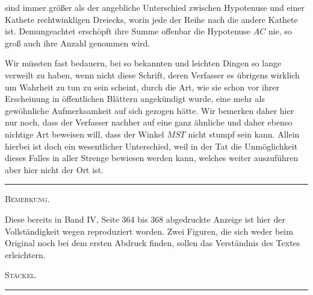 sind immer größer als der angebliche Unterschied zwischen Hypotenuse und einer
Kathete  rechtwinkligen Dreiecks, worin jede der Reihe nach
die andere Kathete ist. Demungeachtet erschöpft ihre Summe offenbar die
Hypotenuse $AC$ nie, so groß auch ihre Anzahl genommen wird.

Wir müssten fast bedauern, bei so bekannten und leichten Dingen so lange
verweilt zu haben, wenn nicht diese Schrift, deren Verfasser es übrigens wirklich um
Wahrheit zu tun zu sein scheint, durch die Art, wie sie schon vor ihrer
Erscheinung in öffentlichen Blättern angekündigt wurde, eine mehr als gewöhnliche
Aufmerksamkeit auf sich gezogen hätte. Wir bemerken daher hier nur noch, dass
der Verfasser nachher auf eine ganz ähnliche und daher ebenso nichtige Art beweisen
will, dass der Winkel $MST$ nicht stumpf sein kann. Allein hierbei ist doch ein
wesentlicher Unterschied, weil in der Tat die Unmöglichkeit dieses Falles in
aller Strenge bewiesen werden kann, welches weiter auszuführen aber hier nicht
der Ort ist.

\begin{center}\rule{3cm}{0.4pt}\end{center}

\begin{center}
\textsc{Bemerkung.}
\end{center}

Diese bereits in Band IV, Seite 364 bis 368 abgedruckte Anzeige ist hier der
Vollständigkeit wegen reproduziert worden. Zwei Figuren, die sich weder beim
Original noch bei dem ersten Abdruck finden, sollen das Verständnis des Textes
erleichtern.

\begin{flushright}\textsc{Stäckel.}\end{flushright}

\begin{center}\rule{3cm}{0.4pt}\end{center}
